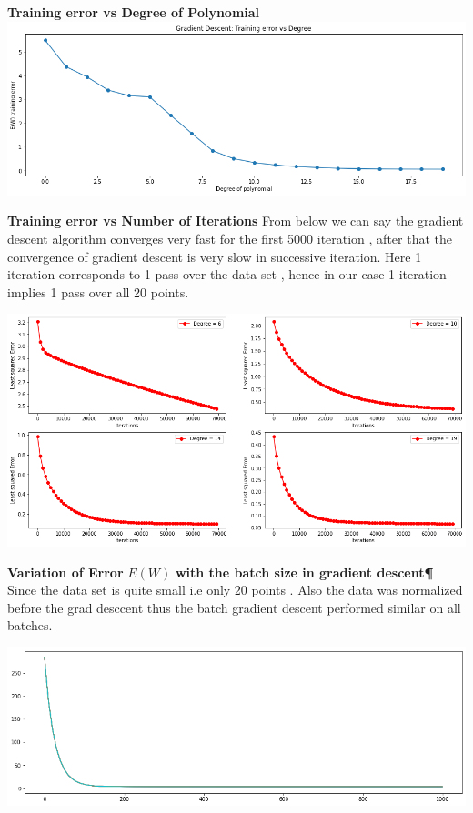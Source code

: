 \documentclass[11pt]{beamer}
\begin{document}
\begin{frame}
\textbf{Training error vs Degree of Polynomial}
\includegraphics[scale=0.3]{images/3.png}
\end{frame}
\textbf{Training error vs Number of Iterations}
From below we can say the gradient descent algorithm converges very fast for the first 5000 iteration , after that the convergence of gradient descent is very slow in successive iteration. Here 1 iteration corresponds to 1 pass over the data set , hence in our case 1 iteration implies 1 pass over all 20 points.


\includegraphics[scale=0.25]{images/4.png}
\begin{frame}
\textbf{Variation of Error} $E(W)$ \textbf{with the batch size in gradient descent¶}\\
Since the data set is quite small i.e only 20 points . Also the data was normalized before the grad desccent thus the batch gradient descent performed similar on all batches.

\includegraphics[scale=0.5]{images/5.png}
\end{frame}
\end{document}
